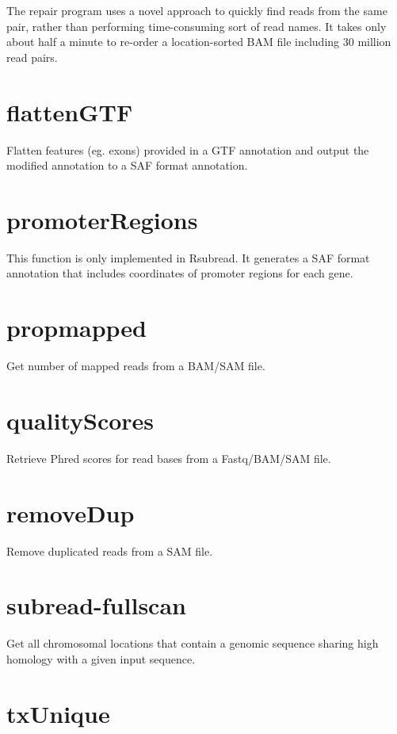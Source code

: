 \documentclass[12pt]{report}
\newcommand{\Rsubread}{\textsf{Rsubread}}
\newcommand{\repair}{\textsf{repair}}
\begin{document}
The {\repair} program uses a novel approach to quickly find reads from the same pair, rather than performing time-consuming sort of read names.
It takes only about half a minute to re-order a location-sorted BAM file including 30 million read pairs.

\section{flattenGTF}

Flatten features (eg. exons) provided in a GTF annotation and output the modified annotation to a SAF format annotation.

\section{promoterRegions}

This function is only implemented in {\Rsubread}. It generates a SAF format annotation that includes coordinates of promoter regions for each gene.

\section{propmapped}

Get number of mapped reads from a BAM/SAM file.

\section{qualityScores}

Retrieve Phred scores for read bases from a Fastq/BAM/SAM file.

\section{removeDup}

Remove duplicated reads from a SAM file.

\section{subread-fullscan}

Get all chromosomal locations that contain a genomic sequence sharing high homology with a given input sequence.

\section{txUnique}
\end{document}

